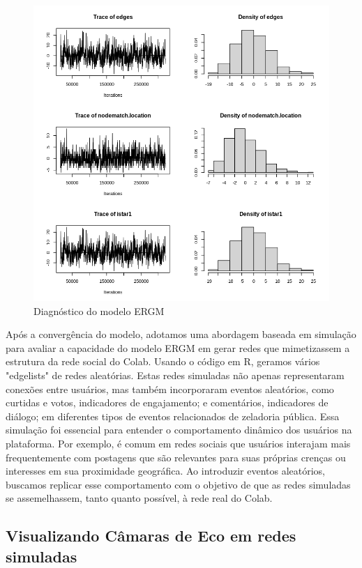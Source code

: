 \begin{figure}[!htb]
	\caption{Diagnóstico do modelo ERGM}
	\label{fig:ergm_diagnostics}
	\centering
	\includegraphics[scale=0.5]{images/ergm_diagnostics.png}
	\fautor
\end{figure}

Após a convergência do modelo, adotamos uma abordagem baseada em simulação para avaliar a capacidade do modelo ERGM em gerar redes que mimetizassem a estrutura da rede social do Colab. Usando o código em R, geramos vários "edgelists" de redes aleatórias. Estas redes simuladas não apenas representaram conexões entre usuários, mas também incorporaram eventos aleatórios, como curtidas e votos, indicadores de engajamento; e comentários, indicadores de diálogo; em diferentes tipos de eventos relacionados de zeladoria pública. Essa simulação foi essencial para entender o comportamento dinâmico dos usuários na plataforma. Por exemplo, é comum em redes sociais que usuários interajam mais frequentemente com postagens que são relevantes para suas próprias crenças ou interesses em sua proximidade geográfica. Ao introduzir eventos aleatórios, buscamos replicar esse comportamento com o objetivo de que as redes simuladas se assemelhassem, tanto quanto possível, à rede real do Colab.

\subsection{Visualizando Câmaras de Eco em redes simuladas}

